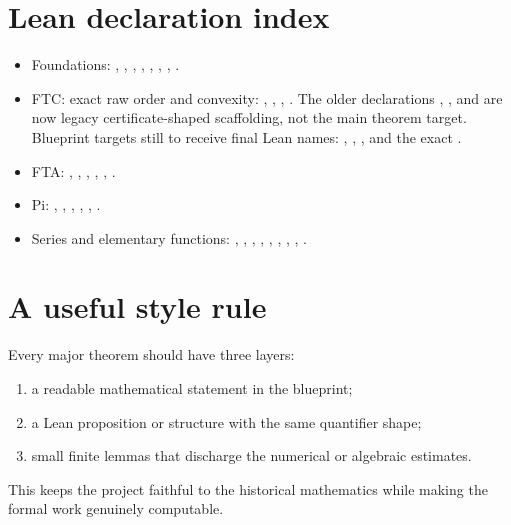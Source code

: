 \section{Lean declaration index}

\begin{itemize}
  \item Foundations:
  , , , , ,
  , , .

  \item FTC:
  exact raw order and convexity:
  , , ,
  .
  The older declarations
  , , and
  are now legacy certificate-shaped scaffolding, not the main theorem target.
  Blueprint targets still to receive final Lean names:
  , ,
  , and the exact .

  \item FTA:
  , , ,
  , ,
  .

  \item Pi:
  , , ,
  , ,
  .

  \item Series and elementary functions:
  , , , ,
  ,
  ,
  ,
  ,
  .
\end{itemize}

\section{A useful style rule}

Every major theorem should have three layers:
\begin{enumerate}
  \item a readable mathematical statement in the blueprint;
  \item a Lean proposition or structure with the same quantifier shape;
  \item small finite lemmas that discharge the numerical or algebraic
  estimates.
\end{enumerate}
This keeps the project faithful to the historical mathematics while making
the formal work genuinely computable.
